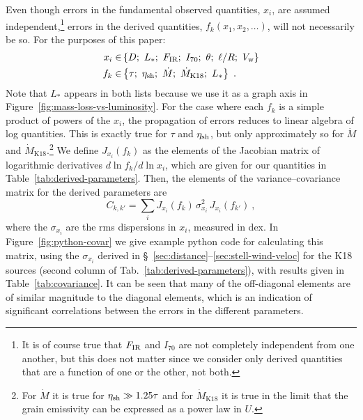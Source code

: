 Even though errors in the fundamental observed quantities, \(x_i\),
are assumed independent,\footnote{%
  It is of course true that \(F_{\text{IR}}\) and \(I_{70}\) are not completely
  independent from one another, but this does not matter since we
  consider only derived quantities that are a function of one or the
  other, not both.} %
errors in the derived quantities, \(f_k(x_1, x_2, \dots)\), will not
necessarily be so.  For the purposes of this paper:
\begin{align}
  \label{eq:observed-and-derived}
  x_i \in &  \left\{D;\ L_*;\ F\IR;\ I_{70};\ \theta;\ \ell/R;\ V\wind \right\} \\
  f_k \in & \left\{\tau;\ \eta\shell;\ \dot M;\ \dot M_{\text{K18}};\ L_* \right\}
            \ .
\end{align}
Note that \(L_*\) appears in both lists because we use it as a graph
axis in Figure~\ref{fig:mass-loss-vs-luminosity}.  For the case where
each \(f_k\) is a simple product of powers of the \(x_i\), the
propagation of errors reduces to linear algebra of log
quantities. This is exactly true for \(\tau\) and \(\eta_{\text{sh}}\), but
only approximately so for \(\dot M\) and
\(\dot M_{\text{K18}}\).\footnote{%
  For \(\dot M\) it is true for \(\eta_{\text{sh}} \gg 1.25 \tau\) and for
  \(\dot M_{\text{K18}}\) it is true in the limit that the grain
  emissivity can be expressed as a power law in \(U\).} %
We define \(J_{x_i} (f_k)\) as the elements of the Jacobian matrix of
logarithmic derivatives \(d \ln f_k / d \ln x_i \), which are given
for our quantities in Table~\ref{tab:derived-parameters}.  Then, the
elements of the variance--covariance matrix for the derived parameters
are
\begin{equation}
  \label{eq:covariance}
  C_{k,k'} = \sum_{i} J_{x_i} (f_k) \, \sigma_{x_i}^2 \, J_{x_i} (f_{k'}) \ , 
\end{equation}
where the \(\sigma_{x_i}\) are the rms dispersions in \(x_i\),
measured in dex.  In Figure~\ref{fig:python-covar} we give example
python code for calculating this matrix, using the \(\sigma_{x_i}\)
derived in \S~\ref{sec:distance}--\ref{sec:stell-wind-veloc} for the
K18 sources (second column of Tab.~\ref{tab:derived-parameters}), with
results given in Table~\ref{tab:covariance}.  It can be seen that many
of the off-diagonal elements are of similar magnitude to the diagonal
elements, which is an indication of significant correlations between
the errors in the different parameters.

